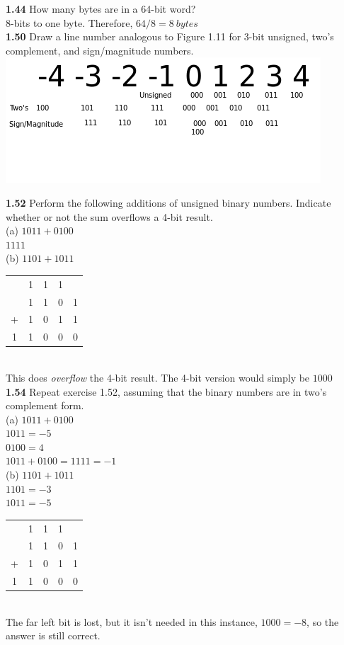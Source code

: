 \documentclass[12pt,a4paper]{report}
\begin{document}
\begin{normalsize}
\textbf{1.44} How many bytes are in a 64-bit word? \\
8-bits to one byte. Therefore, $ 64/8 = 8\: bytes $ \\

\textbf{1.50} Draw a line number analogous to Figure 1.11 for 3-bit unsigned, two's complement, and sign/magnitude numbers. \\
\includegraphics[scale=0.8]{Number_line.png} 

\textbf{1.52} Perform the following additions of unsigned binary numbers. Indicate whether or not the sum overflows a 4-bit result. \\
(a) $ 1011 + 0100 $ \\
$ 1111 $ \\

(b) $ 1101 + 1011 $ \\
\begin{tabular}{c@{\,}c@{\,}c@{\,}c@{\,}c}
  & 1 & 1 & 1 & \\
  & 1 & 1 & 0 & 1 \\
+ & 1 & 0 & 1 & 1 \\
\hline
1 & 1 & 0 & 0 & 0 \\
\end{tabular} \\
This does \emph{overflow} the 4-bit result. The 4-bit version would simply be $ 1000 $ \\

\textbf{1.54} Repeat exercise 1.52, assuming that the binary numbers are in two's complement form. \\
(a) $ 1011 + 0100 $ \\
$ 1011 = -5 $ \\
$ 0100 = 4 $ \\
$ 1011 + 0100 = 1111 = -1 $ \\

(b) $ 1101 + 1011 $ \\
$ 1101 = -3 $ \\
$ 1011 = -5 $ \\
\begin{tabular}{c@{\,}c@{\,}c@{\,}c@{\,}c}
  & 1 & 1 & 1 & \\
  & 1 & 1 & 0 & 1 \\
+ & 1 & 0 & 1 & 1 \\
\hline
1 & 1 & 0 & 0 & 0 \\
\end{tabular} \\
The far left bit is lost, but it isn't needed in this instance, $ 1000 = -8 $, so the answer is still correct. \\


\end{normalsize}
\end{document}
